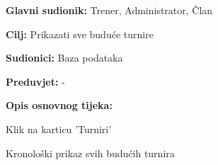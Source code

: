 					\noindent {}
					\begin{packed_item}
	
						\item \textbf{Glavni sudionik: }Trener, Administrator, Član
						\item  \textbf{Cilj: } Prikazati sve buduće turnire
						\item  \textbf{Sudionici: } Baza podataka
						\item  \textbf{Preduvjet: } -
						\item  \textbf{Opis osnovnog tijeka:}
						
						\item[] \begin{packed_enum}
	
							\item Klik na karticu 'Turniri'
							\item Kronološki prikaz svih budućih turnira
						\end{packed_enum}
					\end{packed_item}
					
